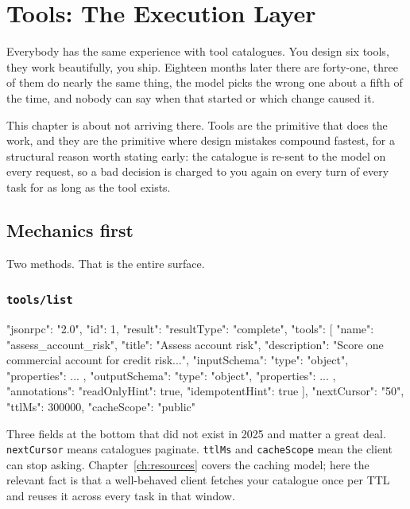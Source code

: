 \chapter{Tools: The Execution Layer}
\label{ch:tools}

Everybody has the same experience with tool catalogues. You design six tools,
they work beautifully, you ship. Eighteen months later there are forty-one,
three of them do nearly the same thing, the model picks the wrong one about a
fifth of the time, and nobody can say when that started or which change caused
it.

This chapter is about not arriving there. Tools are the primitive that does the
work, and they are the primitive where design mistakes compound fastest, for a
structural reason worth stating early: the catalogue is re-sent to the model on
every request, so a bad decision is charged to you again on every turn of every
task for as long as the tool exists.

\section{Mechanics first}

Two methods. That is the entire surface.

\subsection{\texttt{tools/list}}

\begin{wire}
{
  "jsonrpc": "2.0",
  "id": 1,
  "result": {
    "resultType": "complete",
    "tools": [
      {
        "name": "assess_account_risk",
        "title": "Assess account risk",
        "description": "Score one commercial account for credit risk...",
        "inputSchema": { "type": "object", "properties": { ... } },
        "outputSchema": { "type": "object", "properties": { ... } },
        "annotations": { "readOnlyHint": true, "idempotentHint": true }
      }
    ],
    "nextCursor": "50",
    "ttlMs": 300000,
    "cacheScope": "public"
  }
}
\end{wire}

Three fields at the bottom that did not exist in 2025 and matter a great deal.
\texttt{nextCursor} means catalogues paginate. \texttt{ttlMs} and
\texttt{cacheScope} mean the client can stop asking. Chapter~\ref{ch:resources}
covers the caching model; here the relevant fact is that a well-behaved client fetches your catalogue
once per TTL and reuses it across every task in that window.

